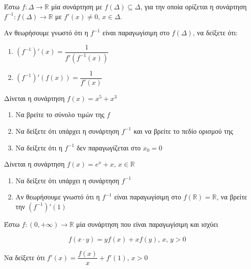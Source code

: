 \documentclass{presentation}
\begin{document}
\begin{askisi}
  Έστω $f:Δ\to\mathbb{R}$ μία συνάρτηση με $f(Δ)\subseteq Δ$, για την οποία ορίζεται η συνάρτηση $f^{-1}:f(Δ)\to\mathbb{R}$ με $f'(x)\ne 0$, $x\in Δ$.

  Αν θεωρήσουμε γνωστό ότι η $f^{-1}$ είναι παραγωγίσιμη στο $f(Δ)$, να δείξετε ότι:
  \begin{enumerate}
    \item<1-> $(f^{-1})'(x)=\dfrac{1}{f'(f^{-1}(x))}$
    \item<2-> $(f^{-1})'(f(x))=\dfrac{1}{f'(x)}$
  \end{enumerate}

\end{askisi}

\begin{askisi}
  Δίνεται η συνάρτηση $f(x)=x^5+x^3$
  \begin{enumerate}
    \item<1-> Να βρείτε το σύνολο τιμών της $f$
    \item<2-> Να δείξετε ότι υπάρχει η συνάρτηση $f^{-1}$ και να βρείτε το πεδίο ορισμού της
    \item<3-> Να δείξετε ότι η $f^{-1}$ δεν παραγωγίζεται στο $x_0=0$
  \end{enumerate}

\end{askisi}

\begin{askisi}
  Δίνεται η συνάρτηση $f(x)=e^x+x$, $x\in\mathbb{R}$
  \begin{enumerate}
    \item<1-> Να δείξετε ότι υπάρχει η συνάρτηση $f^{-1}$
    \item<2-> Αν θεωρήσουμε γνωστό ότι η $f^{-1}$ είναι παραγωγίσιμη στο $f(\mathbb{R})=\mathbb{R}$, να βρείτε την $(f^{-1})'(1)$
  \end{enumerate}

\end{askisi}

\begin{askisi}
  Έστω $f:(0,+\infty)\to\mathbb{R}$ μία συνάρτηση που είναι παραγωγίσιμη και ισχύει

  $$f(x\cdot y)=yf(x)+xf(y) \text{, } x \text{, } y>0$$

  Να δείξετε ότι $f'(x)=\dfrac{f(x)}{x}+f'(1)$, $x>0$

\end{askisi}
\end{document}
